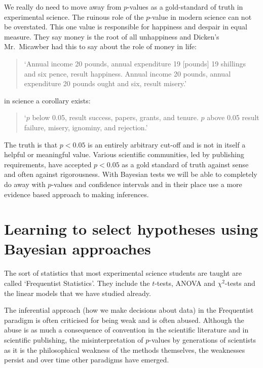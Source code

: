 \documentclass[
]{book}
\begin{document}
We really do need to move away from \(p\)-values as a gold-standard of truth in experimental science. The ruinous role of the \(p\)-value in modern science can not be overstated. This one value is responsible for happiness and despair in equal measure. They say money is the root of all unhappiness and Dicken's Mr.~Micawber had this to say about the role of money in life:

\begin{quote}
`Annual income 20 pounds, annual expenditure 19 {[}pounds{]} 19 shillings and six pence, result happiness. Annual income 20 pounds, annual expenditure 20 pounds ought and six, result misery.'
\end{quote}

in science a corollary exists:

\begin{quote}
`\(p\) below 0.05, result success, papers, grants, and tenure. \(p\) above 0.05 result failure, misery, ignominy, and rejection.'
\end{quote}

The truth is that \(p < 0.05\) is an entirely arbitrary cut-off and is not in itself a helpful or meaningful value. Various scientific communities, led by publishing requirements, have accepted \(p < 0.05\) as a gold standard of truth against sense and often against rigorousness. With Bayesian tests we will be able to completely do away with \(p\)-values and confidence intervals and in their place use a more evidence based approach to making inferences.

\hypertarget{learning-to-select-hypotheses-using-bayesian-approaches}{%
\section{Learning to select hypotheses using Bayesian approaches}\label{learning-to-select-hypotheses-using-bayesian-approaches}}

The sort of statistics that most experimental science students are taught are called `Frequentist Statistics'. They include the \(t\)-tests, ANOVA and \(\chi^2\)-tests and the linear models that we have studied already.

The inferential approach (how we make decisions about data) in the Frequentist paradigm is often criticised for being weak and is often abused. Although the abuse is as much a consequence of convention in the scientific literature and in scientific publishing, the misinterpretation of \(p\)-values by generations of scientists as it is the philosophical weakness of the methods themselves, the weaknesses persist and over time other paradigms have emerged.
\end{document}
